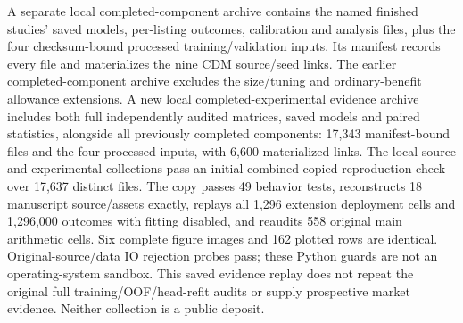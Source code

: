 \documentclass[10pt,journal]{IEEEtran}
\begin{document}
A separate local completed-component archive contains the named finished
studies' saved models, per-listing outcomes, calibration and analysis files,
plus the four checksum-bound processed training/validation inputs. Its
manifest records every file and materializes the nine CDM source/seed links.
The earlier completed-component archive excludes the size/tuning and
ordinary-benefit allowance extensions. A new local completed-experimental
evidence archive includes both full independently audited matrices, saved
models and paired statistics, alongside all previously completed components:
17,343 manifest-bound files and the four processed inputs, with 6,600
materialized links. The local source and experimental collections pass an initial combined copied
reproduction check over 17,637 distinct files. The copy passes 49 behavior
tests, reconstructs 18 manuscript source/assets exactly, replays all 1,296
extension deployment cells and 1,296,000 outcomes with fitting disabled,
and reaudits 558 original main arithmetic cells. Six complete figure images
and 162 plotted rows are identical. Original-source/data IO rejection probes
pass; these Python guards are not an operating-system sandbox. This saved
evidence replay does not repeat the original full training/OOF/head-refit
audits or supply prospective market evidence. Neither collection is a
public deposit.
\end{document}
